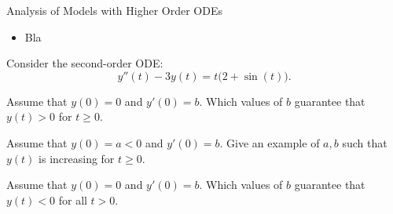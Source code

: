 \standardonlynewpage

%
%



\begin{module}{Analysis of Models with Higher Order ODEs}
	\label{2nd:analysis}

	
	
\end{module}



\begin{lesson}

	\begin{itemize}
		\item Bla
	\end{itemize}
	

\end{lesson}





\question
	Consider the second-order ODE:
	$$
	y''(t) - 3y(t) = t \big( 2 + \sin(t) \big).
	$$
	
	\begin{parts}
		\item Assume that $y(0)=0$ and $y'(0)=b$. Which values of $b$ guarantee that $y(t)>0$ for $t\geq 0$. 
		\item Assume that $y(0)=a<0$ and $y'(0)=b$. Give an example of $a,b$ such that $y(t)$ is increasing for $t\geq 0$. 
		\item Assume that $y(0)=0$ and $y'(0)=b$. Which values of $b$ guarantee that $y(t)<0$ for all $t>0$.

%

	\end{parts}

